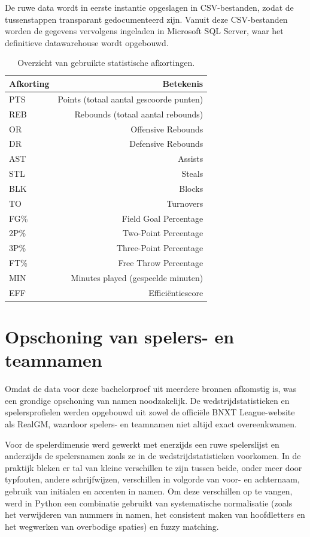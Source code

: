 De ruwe data wordt in eerste instantie opgeslagen in CSV-bestanden, zodat de tussenstappen transparant gedocumenteerd zijn. Vanuit deze CSV-bestanden worden de gegevens vervolgens ingeladen in Microsoft SQL Server, waar het definitieve datawarehouse wordt opgebouwd.

\begin{table}[H]
    \centering
    \caption{Overzicht van gebruikte statistische afkortingen.}
    \label{tab:stat-afkortingen}
    \begin{tabular}{p{} r}
        \toprule
        \textbf{Afkorting} & \textbf{Betekenis} \\
        \midrule
        PTS   & Points (totaal aantal gescoorde punten) \\
        REB   & Rebounds (totaal aantal rebounds) \\
        OR    & Offensive Rebounds \\
        DR    & Defensive Rebounds \\
        AST   & Assists \\
        STL   & Steals \\
        BLK   & Blocks \\
        TO    & Turnovers \\
        FG\%  & Field Goal Percentage \\
        2P\%  & Two-Point Percentage \\
        3P\%  & Three-Point Percentage \\
        FT\%  & Free Throw Percentage \\
        MIN   & Minutes played (gespeelde minuten) \\
        EFF   & Efficiëntiescore \\
        \bottomrule
    \end{tabular}
\end{table}

\section{Opschoning van spelers- en teamnamen}%
\label{sec:data-cleaning}

Omdat de data voor deze bachelorproef uit meerdere bronnen afkomstig is, was een grondige opschoning van namen noodzakelijk. De wedstrijdstatistieken en spelersprofielen werden opgebouwd uit zowel de officiële BNXT League-website als RealGM, waardoor spelers- en teamnamen niet altijd exact overeenkwamen.

Voor de spelerdimensie werd gewerkt met enerzijds een ruwe spelerslijst en anderzijds de spelersnamen zoals ze in de wedstrijdstatistieken voorkomen. In de praktijk bleken er tal van kleine verschillen te zijn tussen beide, onder meer door typfouten, andere schrijfwijzen, verschillen in volgorde van voor- en achternaam, gebruik van initialen en accenten in namen. Om deze verschillen op te vangen, werd in Python een combinatie gebruikt van systematische normalisatie (zoals het verwijderen van nummers in namen, het consistent maken van hoofdletters en het wegwerken van overbodige spaties) en fuzzy matching.

